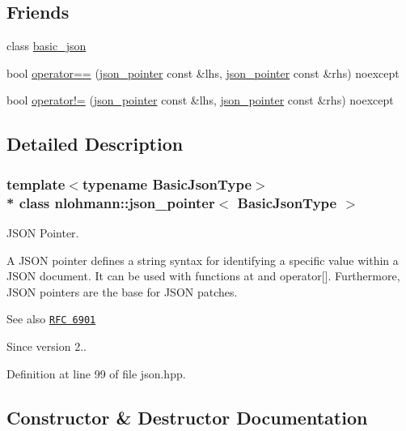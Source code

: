 \subsection*{Friends}
\begin{DoxyCompactItemize}
\item 
class \hyperlink{classnlohmann_1_1json__pointer_ada3100cdb8700566051828f1355fa745}{basic\+\_\+json}
\item 
bool \hyperlink{classnlohmann_1_1json__pointer_a4667ef558c8c3f8a646bfda0c6654653}{operator==} (\hyperlink{classnlohmann_1_1json__pointer}{json\+\_\+pointer} const \&lhs, \hyperlink{classnlohmann_1_1json__pointer}{json\+\_\+pointer} const \&rhs) noexcept
\item 
bool \hyperlink{classnlohmann_1_1json__pointer_a6779edcf28e6f018a3bbb29c0b4b5e1e}{operator!=} (\hyperlink{classnlohmann_1_1json__pointer}{json\+\_\+pointer} const \&lhs, \hyperlink{classnlohmann_1_1json__pointer}{json\+\_\+pointer} const \&rhs) noexcept
\end{DoxyCompactItemize}


\subsection{Detailed Description}
\subsubsection*{template$<$typename Basic\+Json\+Type$>$\\*
class nlohmann\+::json\+\_\+pointer$<$ Basic\+Json\+Type $>$}

J\+S\+ON Pointer. 

A J\+S\+ON pointer defines a string syntax for identifying a specific value within a J\+S\+ON document. It can be used with functions {\ttfamily at} and {\ttfamily operator\mbox{[}\mbox{]}}. Furthermore, J\+S\+ON pointers are the base for J\+S\+ON patches.

\begin{DoxySeeAlso}{See also}
\href{https://tools.ietf.org/html/rfc6901}{\tt R\+FC 6901}
\end{DoxySeeAlso}
\begin{DoxySince}{Since}
version 2.. 
\end{DoxySince}


Definition at line 99 of file json.\+hpp.



\subsection{Constructor \& Destructor Documentation}
